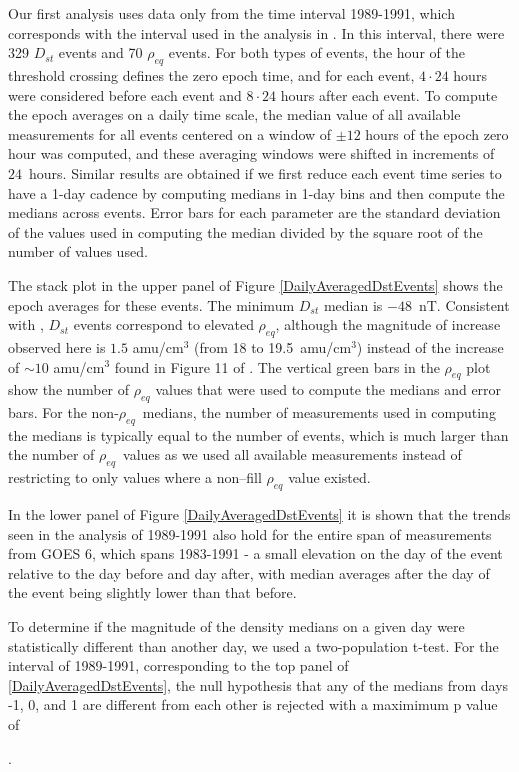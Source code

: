 \documentclass[10pt,twocolumn]{article}
\def\vnote#1\par{\textcolor{red}{\textbf{#1}}\\} %
\newcommand{\req}{\ensuremath{\rho_{eq}}}
\begin{document}
Our first analysis uses data only from the time interval 1989-1991, which corresponds with the interval used in the analysis in \cite{Takahashi2010}. In this interval, there were 329 $D_{st}$ events and 70 $\rho_{eq}$ events.  For both types of events, the hour of the threshold crossing defines the zero epoch time, and for each event, $4\cdot24$ hours were considered before each event and $8\cdot24$ hours after each event.  To compute the epoch averages on a daily time scale, the median value of all available measurements for all events centered on a window of $\pm 12$ hours of the epoch zero hour was computed, and these averaging windows were shifted in increments of $24$~hours. Similar results are obtained if we first reduce each event time series to have a 1-day cadence by computing medians in 1-day bins and then compute the medians across events.  Error bars for each parameter are the standard deviation of the values used in computing the median divided by the square root of the number of values used.

The stack plot in the upper panel of Figure \ref{DailyAveragedDstEvents} shows the epoch averages for these events.  The minimum $D_{st}$ median is $-48$~nT.  Consistent with \cite{Takahashi2010}, $D_{st}$ events correspond to elevated $\rho_{eq}$, although the magnitude of increase observed here is $1.5$ amu/cm$^3$ (from 18 to 19.5~amu/cm$^3$) instead of the increase of $\sim 10$ amu/cm$^3$ found in Figure 11 of \cite{Takahashi2010}.  The vertical green bars in the $\rho_{eq}$ plot show the number of $\rho_{eq}$ values that were used to compute the medians and error bars.  For the non-\req\ medians, the number of measurements used in computing the medians is typically equal to the number of events, which is much larger than the number of \req\ values as we used all available measurements instead of restricting to only values where a non--fill $\rho_{eq}$ value existed.

In the lower panel of Figure \ref{DailyAveragedDstEvents} it is shown that the trends seen in the analysis of 1989-1991 also hold for the entire span of measurements from GOES 6, which spans 1983-1991 - a small elevation on the day of the event relative to the day before and day after, with median averages after the day of the event being slightly lower than that before.  

To determine if the magnitude of the density medians on a given day were statistically different than another day, we used a two-population t-test.  For the interval of 1989-1991, corresponding to the top panel of \ref{DailyAveragedDstEvents}, the null hypothesis that any of the medians from days -1, 0, and 1 are different from each other is rejected with a maximimum p value of \vnote{??}.
\end{document}
